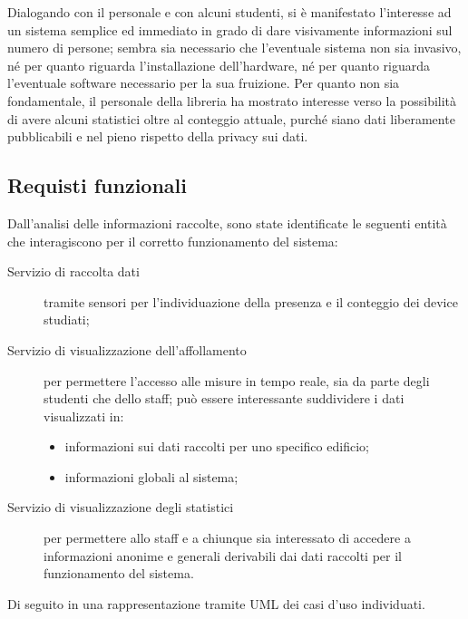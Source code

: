 Dialogando con il personale e con alcuni studenti, si è manifestato l'interesse ad un sistema semplice ed immediato in grado di dare visivamente informazioni sul numero di persone;
sembra sia necessario che l'eventuale sistema non sia invasivo, né per quanto riguarda l'installazione dell'hardware, né per quanto riguarda l'eventuale software necessario per la sua fruizione.
Per quanto non sia fondamentale, il personale della libreria ha mostrato interesse verso la possibilità di avere alcuni statistici oltre al conteggio attuale, purché siano dati liberamente pubblicabili e nel pieno rispetto della privacy sui dati.

\subsection{Requisti funzionali}

Dall'analisi delle informazioni raccolte, sono state identificate le seguenti entità che interagiscono per il corretto funzionamento del sistema:

\begin{description}
    \item[Servizio di raccolta dati]
      tramite sensori per l'individuazione della presenza e il conteggio dei device studiati;
    \item[Servizio di visualizzazione dell'affollamento]
      per permettere l'accesso alle misure in tempo reale, sia da parte degli studenti che dello staff;
      può essere interessante suddividere i dati visualizzati in:
      \begin{itemize}
        \item informazioni sui dati raccolti per uno specifico edificio;
        \item informazioni globali al sistema;
      \end{itemize}
    \item[Servizio di visualizzazione degli statistici]
      per permettere allo staff e a chiunque sia interessato di accedere a informazioni anonime e generali
      derivabili dai dati raccolti per il funzionamento del sistema.
\end{description}

Di seguito in  una rappresentazione tramite UML dei casi d'uso individuati.

